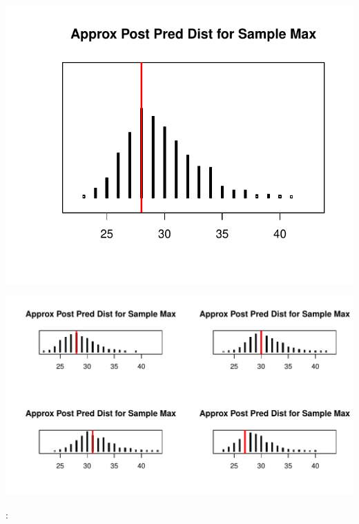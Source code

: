 \documentclass[12pt]{article}\usepackage[]{graphicx}\usepackage[]{color}
\newenvironment{knitrout}{}{} %
\begin{document}
\begin{doublespacing}
\begin{enumerate}
\begin{center}
\begin{knitrout}\footnotesize
{}\color{fgcolor}
\includegraphics[width=.5\linewidth]{figure/postmax-1} 

\end{knitrout}
\end{center}

\begin{knitrout}\footnotesize
{}\color{fgcolor}
\includegraphics[width=\linewidth]{figure/explore2-1} 

\end{knitrout}


\end{enumerate}

:


\end{doublespacing}
\end{document}
